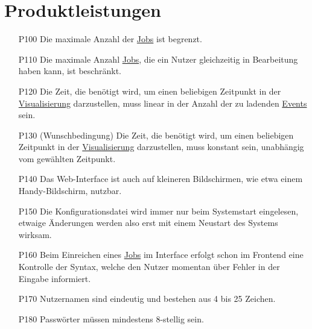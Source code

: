 \section{Produktleistungen}

%

\begin{itemize}[noitemsep]
    \item[P100] Die maximale Anzahl der \hyperref[B:Jobs]{Jobs} ist begrenzt.
    
    \item[P110] Die maximale Anzahl \hyperref[B:Jobs]{Jobs}, die ein Nutzer gleichzeitig in Bearbeitung haben kann, ist beschränkt.
    
    \item[P120] Die Zeit, die benötigt wird, um einen beliebigen Zeitpunkt in der \hyperref[pages:visualization]{Visualisierung} darzustellen, muss linear in der Anzahl der zu ladenden \hyperref[B:Event]{Events} sein.
    
    \item[P130] (Wunschbedingung)  Die Zeit, die benötigt wird, um einen beliebigen Zeitpunkt in der \hyperref[pages:visualization]{Visualisierung} darzustellen, muss konstant sein, unabhängig vom gewählten Zeitpunkt.
    
    \item[P140] Das \gls{Web-Interface} ist auch auf kleineren Bildschirmen, wie etwa einem Handy-Bildschirm, nutzbar.
    
    \item[P150] Die \gls{Konfigurationsdatei} wird immer nur beim Systemstart eingelesen, etwaige Änderungen werden also erst mit einem Neustart des Systems wirksam.
    
    \item[P160] Beim Einreichen eines \hyperref[B:Jobs]{Jobs} im Interface erfolgt schon im Frontend eine Kontrolle der Syntax, welche den Nutzer momentan über Fehler in der Eingabe informiert.
    
    \item[P170] Nutzernamen sind eindeutig und bestehen aus 4 bis 25 Zeichen.

    \item[P180] Passwörter müssen mindestens 8-stellig sein.
    

\end{itemize}
